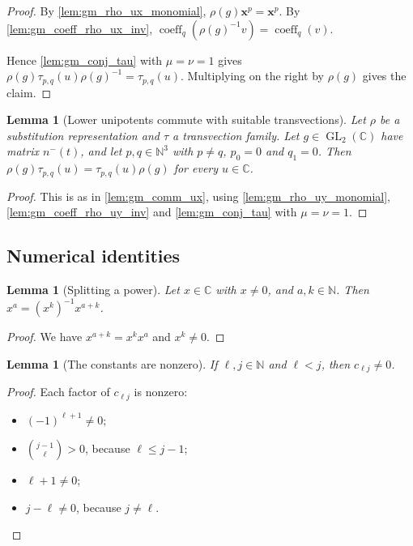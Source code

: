 \documentclass[11pt]{article}
\newtheorem{lemma}[theorem]{Lemma}
\theoremstyle{definition}
\theoremstyle{remark}
\newcommand{\CC}{\mathbb{C}}
\newcommand{\NN}{\mathbb{N}}
\DeclareMathOperator{\GL}{GL}
\DeclareMathOperator{\coeff}{coeff}
\begin{document}
\begin{proof}
By \cref{lem:gm_rho_ux_monomial}, $\rho(g)\mathbf x^p=\mathbf x^p$. By \cref{lem:gm_coeff_rho_ux_inv}, $\coeff_q(\rho(g)^{-1}v)=\coeff_q(v)$.

Hence \cref{lem:gm_conj_tau} with $\mu=\nu=1$ gives $\rho(g)\tau_{p,q}(u)\rho(g)^{-1}=\tau_{p,q}(u)$. Multiplying on the right by $\rho(g)$ gives the claim.
\end{proof}

\begin{lemma}[Lower unipotents commute with suitable transvections]\label{lem:gm_comm_uy}
Let $\rho$ be a substitution representation and $\tau$ a transvection family. Let $g\in\GL_2(\CC)$ have matrix $n^-(t)$, and let $p,q\in\NN^3$ with $p\neq q$, $p_0=0$ and $q_1=0$. Then $\rho(g)\tau_{p,q}(u)=\tau_{p,q}(u)\rho(g)$ for every $u\in\CC$.
\end{lemma}

\begin{proof}
This is as in \cref{lem:gm_comm_ux}, using \cref{lem:gm_rho_uy_monomial}, \cref{lem:gm_coeff_rho_uy_inv} and \cref{lem:gm_conj_tau} with $\mu=\nu=1$.
\end{proof}

\subsection{Numerical identities}

\begin{lemma}[Splitting a power]\label{lem:gm_pow_inv_mul}
Let $x\in\CC$ with $x\neq 0$, and $a,k\in\NN$. Then $x^a=(x^k)^{-1}x^{a+k}$.
\end{lemma}

\begin{proof}
We have $x^{a+k}=x^kx^a$ and $x^k\ne0$.
\end{proof}

\begin{lemma}[The constants are nonzero]\label{lem:gm_cst_ne_zero}
If $\ell,j\in\NN$ and $\ell<j$, then $c_{\ell j}\neq0$.
\end{lemma}

\begin{proof}
Each factor of $c_{\ell j}$ is nonzero:
\begin{itemize}
\item $(-1)^{\ell+1}\ne0$;
\item $\binom{j-1}{\ell}>0$, because $\ell\le j-1$;
\item $\ell+1\neq0$;
\item $j-\ell\ne0$, because $j\ne\ell$.
\end{itemize}
\end{proof}
\end{document}
